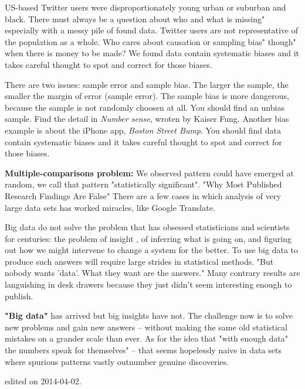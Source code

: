 US-based Twitter users were disproportionately young  urban or suburban and black.
There must always be a question about who and what is missing" especially with a messy pile of found data.
Twitter users are not representative of the population as a whole.
Who cares about causation or sampling bias" though" when there is money to be made?
We found data contain systematic biases and it takes careful thought to spot and correct for those biases. 

There are two issues: sample error and sample bias. The larger the sample, the smaller the margin of error (sample error). 
The sample bias is more dangerous, because the sample is not randomly 
choosen at all. 
You should find an unbias sample. Find the detail in {\it Number sense}, wroten by Kaiser Fung.
Another bias example is about the iPhone app, {\it Boston Street Bump}.
You should find data contain systematic biases and it takes careful thought to
spot and correct for those biases.

{\bf Multiple-comparisons problem: }
We observed pattern could have emerged at random, we call that pattern "statistically significant".
"Why Most Published Research Findings Are False"
There are a few cases in which analysis of very large data sets has worked miracles, like
Google Translate.

Big data do not solve the problem that has obsessed statisticians and scientists for centuries: the problem of insight , of inferring what is going on, and figuring out how we might intervene to change a system for the better.  To use big data to produce such answers will require large strides in statistical methods.
"But nobody wants 'data'. What they want are the answers."
Many contrary results are languishing in desk drawers because they just didn't seem interesting enough to publish. 

{\bf{"Big data"}} has arrived but big insights have not. The challenge now is to solve new problems and gain new answers -- without making the same old statistical mistakes on a grander scale than ever.
As for the idea that "with enough data" the numbers speak for themselves" -- that seems hopelessly naive in data sets where spurious patterns vastly outnumber genuine discoveries.


\hfill {\tiny edited on 2014-04-02.}

